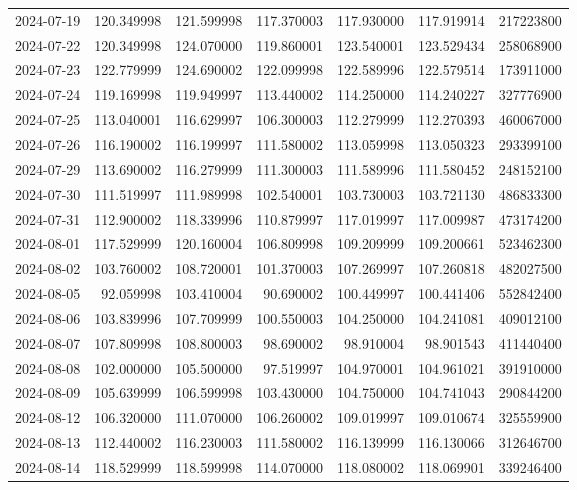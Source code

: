 \begin{tabular}{lrrrrrr}
2024-07-19 &  120.349998 &  121.599998 &  117.370003 &  117.930000 &  117.919914 &   217223800 \\
2024-07-22 &  120.349998 &  124.070000 &  119.860001 &  123.540001 &  123.529434 &   258068900 \\
2024-07-23 &  122.779999 &  124.690002 &  122.099998 &  122.589996 &  122.579514 &   173911000 \\
2024-07-24 &  119.169998 &  119.949997 &  113.440002 &  114.250000 &  114.240227 &   327776900 \\
2024-07-25 &  113.040001 &  116.629997 &  106.300003 &  112.279999 &  112.270393 &   460067000 \\
2024-07-26 &  116.190002 &  116.199997 &  111.580002 &  113.059998 &  113.050323 &   293399100 \\
2024-07-29 &  113.690002 &  116.279999 &  111.300003 &  111.589996 &  111.580452 &   248152100 \\
2024-07-30 &  111.519997 &  111.989998 &  102.540001 &  103.730003 &  103.721130 &   486833300 \\
2024-07-31 &  112.900002 &  118.339996 &  110.879997 &  117.019997 &  117.009987 &   473174200 \\
2024-08-01 &  117.529999 &  120.160004 &  106.809998 &  109.209999 &  109.200661 &   523462300 \\
2024-08-02 &  103.760002 &  108.720001 &  101.370003 &  107.269997 &  107.260818 &   482027500 \\
2024-08-05 &   92.059998 &  103.410004 &   90.690002 &  100.449997 &  100.441406 &   552842400 \\
2024-08-06 &  103.839996 &  107.709999 &  100.550003 &  104.250000 &  104.241081 &   409012100 \\
2024-08-07 &  107.809998 &  108.800003 &   98.690002 &   98.910004 &   98.901543 &   411440400 \\
2024-08-08 &  102.000000 &  105.500000 &   97.519997 &  104.970001 &  104.961021 &   391910000 \\
2024-08-09 &  105.639999 &  106.599998 &  103.430000 &  104.750000 &  104.741043 &   290844200 \\
2024-08-12 &  106.320000 &  111.070000 &  106.260002 &  109.019997 &  109.010674 &   325559900 \\
2024-08-13 &  112.440002 &  116.230003 &  111.580002 &  116.139999 &  116.130066 &   312646700 \\
2024-08-14 &  118.529999 &  118.599998 &  114.070000 &  118.080002 &  118.069901 &   339246400 \\

\end{tabular}
